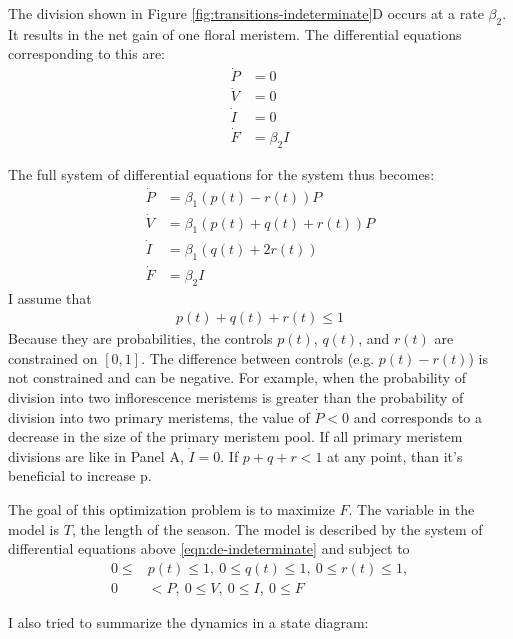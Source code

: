 \documentclass[12pt, oneside,titlepage]{article}   	%
\begin{document}
The division shown in Figure \ref{fig:transitions-indeterminate}D occurs at a rate $\beta_2 $. It results in the net gain of one floral meristem. The differential equations corresponding to this are:
%
\begin{align}
\dot{P} & = 0 \nonumber \\
\dot{V} & = 0      \nonumber \\
\dot{I} & =  0 \nonumber \\
\dot{F} & = \beta_2 I
\end{align}
%

The full system of differential equations for the system thus becomes:
%
\begin{align}
\dot{P} & = \beta_1 (p(t) - r(t)) P  \nonumber \\
\dot{V} & = \beta_1 (p(t) + q(t) + r(t) ) P     \nonumber \\
\dot{I} & =  \beta_1 (q(t) + 2 r(t) ) \nonumber \\
\dot{F} & = \beta_2 I
\label{eqn:de-indeterminate}
\end{align}
%
I assume that 
%
\begin{align}
p(t) + q(t) + r(t) \leq 1
\end{align}
Because they are probabilities, the controls $p(t)$, $q(t)$, and $r(t)$ are constrained on $[0,1]$. The difference between controls (e.g. $p(t) - r(t)$) is not constrained and can be negative. For example, when the probability of division into two inflorescence meristems is greater than the probability of division into two primary meristems, the value of $\dot{P}<0$ and corresponds to a decrease in the size of the primary meristem pool. If all primary meristem divisions are like in Panel A, $\dot{I} = 0$. If $p + q + r < 1$ at any point, than it's beneficial to increase p.

The goal of this optimization problem is to maximize $F$. The variable in the model is $T$, the length of the season. The model is described by the system of differential equations above \ref{eqn:de-indeterminate} and subject to 
%
\begin{align}
0 \leq & p(t) \leq 1,\ 0 \leq q(t) \leq 1,\ 0 \leq r(t) \leq 1,  \nonumber \\
0 & < P,\ 0 \leq V,\ 0 \leq I,\ 0  \leq F 
\label{eqn:constraints-indeterminate}
\end{align}

I also tried to summarize the dynamics in a state diagram:
\end{document}
